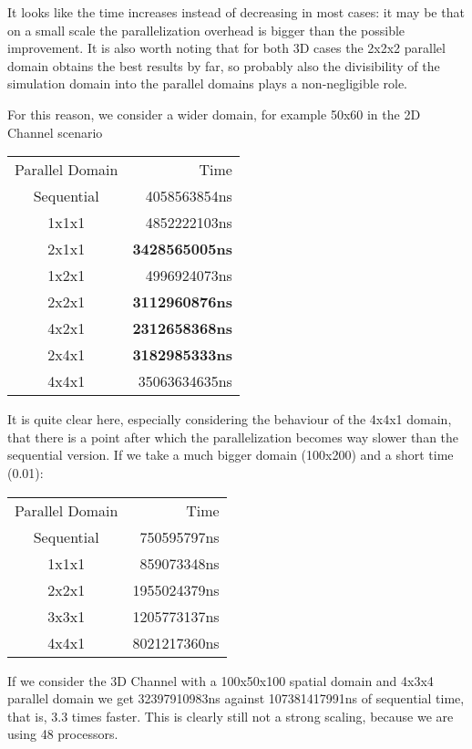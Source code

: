\documentclass[
  english,        %
  font=palatino,     %
  onecolumn,      %
]{tumarticle}
\begin{document}
It looks like the time increases instead of decreasing in most cases: it may be that on a small scale the parallelization overhead is bigger than the possible improvement. It is also worth noting that for both 3D cases the 2x2x2 parallel domain obtains the best results by far, so probably also the divisibility of the simulation domain into the parallel domains plays a non-negligible role.

For this reason, we consider a wider domain, for example 50x60 in the 2D Channel scenario

\begin{tabular}{c r}
  Parallel Domain & Time                  \\
  Sequential      & 4058563854ns          \\
  1x1x1           & 4852222103ns          \\
  2x1x1           & \textbf{3428565005ns} \\
  1x2x1           & 4996924073ns          \\
  2x2x1           & \textbf{3112960876ns} \\
  4x2x1           & \textbf{2312658368ns} \\
  2x4x1           & \textbf{3182985333ns} \\
  4x4x1           & 35063634635ns         \\
\end{tabular}

It is quite clear here, especially considering the behaviour of the 4x4x1 domain, that there is a point after which the parallelization becomes way slower than the sequential version. If we take a much bigger domain (100x200) and a short time (0.01):


\begin{tabular}{c r}
  Parallel Domain & Time         \\
  Sequential      & 750595797ns  \\
  1x1x1           & 859073348ns  \\
  2x2x1           & 1955024379ns \\
  3x3x1           & 1205773137ns \\
  4x4x1           & 8021217360ns \\
\end{tabular}

If we consider the 3D Channel with a 100x50x100 spatial domain and 4x3x4 parallel domain we get 32397910983ns against 107381417991ns of sequential time, that is, 3.3 times faster. This is clearly still not a strong scaling, because we are using 48 processors. 
   
\end{document}
